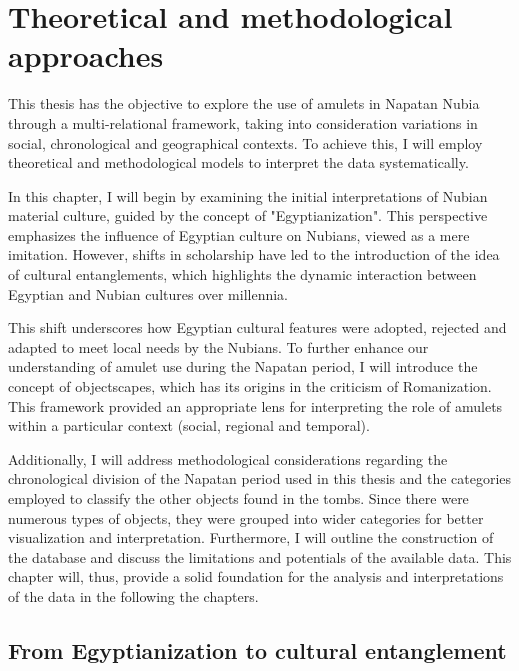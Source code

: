 \chapter{Theoretical and methodological approaches}


This thesis has the objective to explore the use of amulets in Napatan Nubia through a multi-relational framework, taking into consideration variations in social, chronological and geographical contexts. To achieve this, I will employ theoretical and methodological models to interpret the data systematically.


In this chapter, I will begin by examining the initial interpretations of Nubian material culture, guided by the concept of "Egyptianization". This perspective emphasizes the influence of Egyptian culture on Nubians, viewed as a mere imitation. However, shifts in scholarship have led to the introduction of the idea of cultural entanglements, which highlights the dynamic interaction between Egyptian and Nubian cultures over millennia.


This shift underscores how Egyptian cultural features were adopted, rejected and adapted to meet local needs by the Nubians. To further enhance our understanding of amulet use during the Napatan period, I will introduce the concept of objectscapes, which has its origins in the criticism of Romanization. This framework provided an appropriate lens for interpreting the role of amulets within a particular context (social, regional and temporal).


Additionally, I will address methodological considerations regarding the chronological division of the Napatan period used in this thesis and the categories employed to classify the other objects found in the tombs. Since there were numerous types of objects, they were grouped into wider categories for better visualization and interpretation. Furthermore, I will outline the construction of the database and discuss the limitations and potentials of the available data.
This chapter will, thus, provide a solid foundation for the analysis and interpretations of the data in the following the chapters.


\section{From Egyptianization to cultural entanglement}


